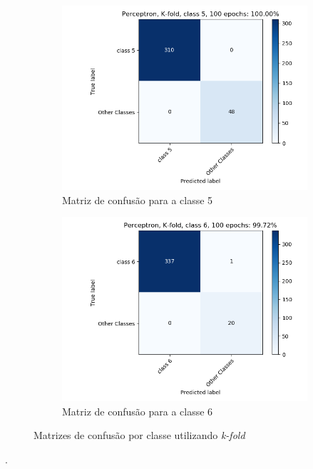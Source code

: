 \documentclass[paper=a4, fontsize=11pt]{scrartcl}
\numberwithin{equation}{section}		%
\numberwithin{figure}{section}			%
\numberwithin{table}{section}				%
\begin{document}
\begin{figure}[h!]
\begin{subfigure}{.5\textwidth}
			\includegraphics[width=\linewidth]{img/q3_fig_kfold_classe5.png}
			\caption{Matriz de confusão para a classe 5}
			\label{fig:q1grau6}
		\end{subfigure}%
		\begin{subfigure}{.5\textwidth}
			\centering
			\includegraphics[width=\linewidth]{img/q3_fig_kfold_classe6.png}
			\caption{Matriz de confusão para a classe 6}
			\label{fig:q1grau6}
		\end{subfigure}%
		
		\caption{Matrizes de confusão por classe utilizando \textit{k-fold}}
		\label{fig:confusao_kfold}
	\end{figure}
	
	\newpage
	.
	\newpage
    
\end{document}
